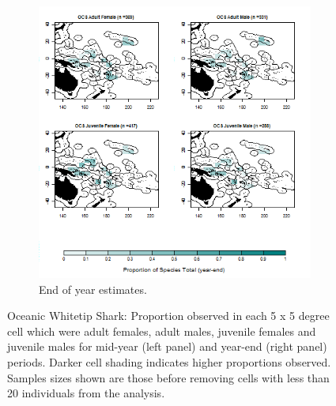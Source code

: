 \documentclass[12pt]{SCreport}
\begin{document}
\begin{landscape}
\begin{figure}
\begin{subfigure}[b]{0.6\textwidth}
       \includegraphics[width=\textwidth]{../GRAPHICS/Defined/BI_27_Map_maturity_sex_OCS}
       \caption{End of year estimates.}
       \label{fig:BI_27}
   \end{subfigure}
\caption{Oceanic Whitetip Shark: Proportion observed in each 5 x 5 degree cell which were adult females, adult males, juvenile females and juvenile males for mid-year (left panel) and year-end (right panel) periods. Darker cell shading indicates higher proportions observed. Samples sizes shown are those before removing cells with less than 20 individuals from the analysis. }
\label{BI_M05} 
\end{figure}
\end{landscape}
\end{document}
